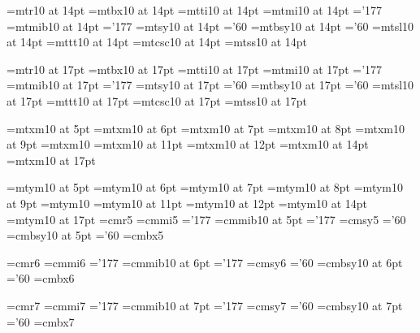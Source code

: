 \font\fourteenrm=mtr10 at 14pt
\font\fourteenbf=mtbx10 at 14pt
\font\fourteenit=mtti10 at 14pt
\font\fourteeni=mtmi10 at 14pt      \skewchar\fourteeni='177
\font\fourteenmib=mtmib10 at 14pt   \skewchar\fourteenmib='177
\font\fourteensy=mtsy10 at 14pt     \skewchar\fourteensy='60
\font\fourteensyb=mtbsy10 at 14pt   \skewchar\fourteensyb='60
\font\fourteensl=mtsl10 at 14pt
\font\fourteentt=mttt10 at 14pt     \hyphenchar{}
\font\fourteencsc=mtcsc10 at 14pt
\font\fourteensf=mtss10 at 14pt

\font\seventeenrm=mtr10 at 17pt
\font\seventeenbf=mtbx10 at 17pt
\font\seventeenit=mtti10 at 17pt
\font\seventeeni=mtmi10 at 17pt      \skewchar\seventeeni='177
\font\seventeenmib=mtmib10 at 17pt   \skewchar\seventeenmib='177
\font\seventeensy=mtsy10 at 17pt     \skewchar\seventeensy='60
\font\seventeensyb=mtbsy10 at 17pt   \skewchar\seventeensyb='60
\font\seventeensl=mtsl10 at 17pt
\font\seventeentt=mttt10 at 17pt     \hyphenchar{}
\font\seventeencsc=mtcsc10 at 17pt
\font\seventeensf=mtss10 at 17pt


\newfam\xmfam
\newfam\ymfam

\font\fivexm=mtxm10 at 5pt
\font\sixxm=mtxm10 at 6pt
\font\sevenxm=mtxm10 at 7pt
\font\eightxm=mtxm10 at 8pt
\font\ninexm=mtxm10 at 9pt
\font\tenxm=mtxm10
\font\elevenxm=mtxm10 at 11pt
\font\twelvexm=mtxm10 at 12pt
\font\fourteenxm=mtxm10 at 14pt
\font\seventeenxm=mtxm10 at 17pt

\font\fiveym=mtym10 at 5pt
\font\sixym=mtym10 at 6pt
\font\sevenym=mtym10 at 7pt
\font\eightym=mtym10 at 8pt
\font\nineym=mtym10 at 9pt
\font\tenym=mtym10
\font\elevenym=mtym10 at 11pt
\font\twelveym=mtym10 at 12pt
\font\fourteenym=mtym10 at 14pt
\font\seventeenym=mtym10 at 17pt
%
\else
%
\font\fiverm=cmr5
\font\fivei=cmmi5             \skewchar\fivei='177
\font\fivemib=cmmib10 at 5pt  \skewchar\fivemib='177
\font\fivesy=cmsy5            \skewchar\fivesy='60
\font\fivesyb=cmbsy10 at 5pt  \skewchar\fivesyb='60
\font\fivebf=cmbx5

\font\sixrm=cmr6
\font\sixi=cmmi6             \skewchar\sixi='177
\font\sixmib=cmmib10 at 6pt  \skewchar\sixmib='177
\font\sixsy=cmsy6            \skewchar\sixsy='60
\font\sixsyb=cmbsy10 at 6pt  \skewchar\sixsyb='60
\font\sixbf=cmbx6

\font\sevenrm=cmr7
\font\seveni=cmmi7             \skewchar\seveni='177
\font\sevenmib=cmmib10 at 7pt  \skewchar\sevenmib='177
\font\sevensy=cmsy7            \skewchar\sevensy='60
\font\sevensyb=cmbsy10 at 7pt  \skewchar\sevensyb='60
\font\sevenbf=cmbx7

